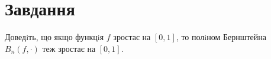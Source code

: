 
\chapter{Завдання \theHchapter}

\begin{tcolorbox}[title=Завдання]
    Доведiть, що якщо функцiя $f$ зростає на $[0, 1]$, то полiном 
    Бернштейна $B_n(f, \cdot)$ теж зростає на $[0, 1]$.
\end{tcolorbox}



